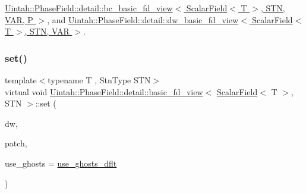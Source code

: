 \hyperlink{classUintah_1_1PhaseField_1_1detail_1_1bc__basic__fd__view_3_01ScalarField_3_01T_01_4_00_01STN_00_01VAR_00_01P_01_4_aa82811e38cba5075406deb5e0f4adf62}{Uintah\+::\+Phase\+Field\+::detail\+::bc\+\_\+basic\+\_\+fd\+\_\+view$<$ Scalar\+Field$<$ T $>$, S\+T\+N, V\+A\+R, P $>$}, and \hyperlink{classUintah_1_1PhaseField_1_1detail_1_1dw__basic__fd__view_3_01ScalarField_3_01T_01_4_00_01STN_00_01VAR_01_4_af125295808e73f3d236f85f45d054b23}{Uintah\+::\+Phase\+Field\+::detail\+::dw\+\_\+basic\+\_\+fd\+\_\+view$<$ Scalar\+Field$<$ T $>$, S\+T\+N, V\+A\+R $>$}.

\mbox{\label{classUintah_1_1PhaseField_1_1detail_1_1basic__fd__view_3_01ScalarField_3_01T_01_4_00_01STN_01_4_a26d507d016ee4c943903214e7547594a}} 
\subsubsection{\texorpdfstring{set()}{set()}\hspace{0.1cm}{\footnotesize\ttfamily [1/2]}}
{\footnotesize\ttfamily template$<$typename T , Stn\+Type S\+TN$>$ \\
virtual void \hyperlink{classUintah_1_1PhaseField_1_1detail_1_1basic__fd__view}{Uintah\+::\+Phase\+Field\+::detail\+::basic\+\_\+fd\+\_\+view}$<$ \hyperlink{structUintah_1_1PhaseField_1_1ScalarField}{Scalar\+Field}$<$ T $>$, S\+TN $>$\+::set (\begin{DoxyParamCaption}\item[{Data\+Warehouse $\ast$}]{dw,  }\item[{const Patch $\ast$}]{patch,  }\item[{bool}]{use\+\_\+ghosts = {\ttfamily \hyperlink{classUintah_1_1PhaseField_1_1detail_1_1basic__fd__view_3_01ScalarField_3_01T_01_4_00_01STN_01_4_a2faa49acca4f2f6983d318ae64e3ed39}{use\+\_\+ghosts\+\_\+dflt}} }\end{DoxyParamCaption})\hspace{0.3cm}{\ttfamily [pure virtual]}}



